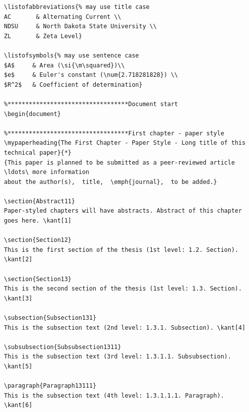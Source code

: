 \documentclass{article}
\begin{document}
\begin{verbatim}
\listofabbreviations{% may use title case
AC       & Alternating Current \\
NDSU     & North Dakota State University \\
ZL       & Zeta Level}

\listofsymbols{% may use sentence case
$A$     & Area (\si{\m\squared})\\
$e$     & Euler's constant (\num{2.718281828}) \\
$R^2$   & Coefficient of determination}

%**********************************Document start
\begin{document}

%**********************************First chapter - paper style
\mypaperheading{The First Chapter - Paper Style - Long title of this technical paper}{*}
{This paper is planned to be submitted as a peer-reviewed article \ldots\ more information 
about the author(s),  title,  \emph{journal},  to be added.}

\section{Abstract11}
Paper-styled chapters will have abstracts. Abstract of this chapter goes here. \kant[1]

\section{Section12}
This is the first section of the thesis (1st level: 1.2. Section). \kant[2]

\section{Section13}
This is the second section of the thesis (1st level: 1.3. Section). \kant[3]

\subsection{Subsection131}
This is the subsection text (2nd level: 1.3.1. Subsection). \kant[4]

\subsubsection{Subsubsection1311}
This is the subsection text (3rd level: 1.3.1.1. Subsubsection). \kant[5]

\paragraph{Paragraph13111}
This is the subsection text (4th level: 1.3.1.1.1. Paragraph). \kant[6]


\end{verbatim}
\end{document}
